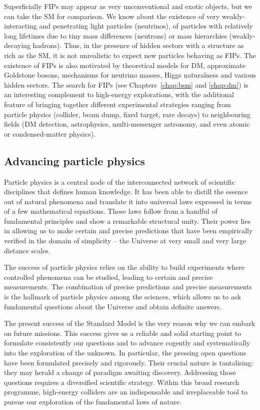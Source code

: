 \documentclass[../report.tex]{subfiles}
\begin{document}
Superficially FIPs may appear as very unconventional and exotic objects, but we can take the SM for comparison. We know about the existence of very weakly-interacting and penetrating light particles (neutrinos), of particles with relatively long lifetimes due to tiny mass differences (neutrons) or mass hierarchies (weakly-decaying hadrons). Thus, in the presence of hidden sectors with a structure as rich as the SM, it is not unrealistic to expect new particles behaving as FIPs. The existence of FIPs is also motivated by theoretical models for DM, approximate Goldstone bosons, mechanisms for neutrino masses, Higgs naturalness and various hidden sectors. The search for FIPs (see Chapters~\ref{chap:bsm} and \ref{chap:dm}) is an interesting complement to high-energy explorations, with the additional feature of bringing together different experimental strategies ranging from particle physics (collider, beam dump, fixed target, rare decays) to neighbouring fields (DM detection, astrophysics, multi-messenger astronomy, and even atomic or condensed-matter physics).

\subsection*{Advancing particle physics}

Particle physics is a central node of the interconnected network of scientific disciplines that defines human knowledge. It has been able to distill the essence out of natural phenomena and translate it into universal laws expressed in terms of a few mathematical equations. Those laws follow from a handful of fundamental principles and show a remarkable structural unity. Their power lies in allowing us to make certain and precise predictions that have been empirically verified in the domain of simplicity -- the Universe at very small and very large distance scales. 

  The success of particle physics relies on the ability to build experiments where controlled phenomena can be studied, leading to certain and precise measurements. The combination of precise predictions and precise measurements is the hallmark of particle physics among the sciences, which allows us to ask fundamental questions about the Universe and obtain definite answers. 

 The present success of the Standard Model is the very reason why we can embark on future missions. This success 
  gives us a reliable and solid starting point to formulate consistently our questions and to advance cogently and systematically into the exploration of the unknown.   In particular, the pressing  open questions have been formulated precisely and rigorously.  Their crucial nature is tantalising: they may herald a change of paradigm awaiting discovery. 
   Addressing those questions 
  requires a diversified scientific strategy. Within this broad research programme, high-energy colliders are an indispensable and irreplaceable tool to pursue our exploration of the fundamental laws of nature.
 
\end{document}
